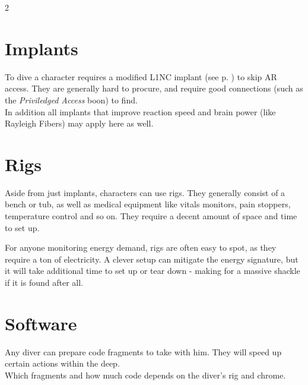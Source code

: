 \begin{multicols}{2}
\section{Implants}
To dive a character requires a modified L1NC implant (see p. \pageref{sec:modifiedl1ncs}) to skip AR access.
They are generally hard to procure, and require good connections (such as the \emph{Priviledged Access} boon) to find.
\\%
In addition all implants that improve reaction speed and brain power (like Rayleigh Fibers) may apply here as well.

\section{Rigs}
Aside from just implants, characters can use rigs.
They generally consist of a bench or tub, as well as medical equipment like vitals monitors, pain stoppers, temperature control and so on.
They require a decent amount of space and time to set up.
\par
For anyone monitoring energy demand, rigs are often easy to spot, as they require a ton of electricity.
A clever setup can mitigate the energy signature, but it will take additional time to set up or tear down - making for a massive shackle if it is found after all.

\section{Software}
Any diver can prepare code fragments to take with him.
They will speed up certain actions within the deep.
\\%
Which fragments and how much code depends on the diver's rig and chrome.

\end{multicols}